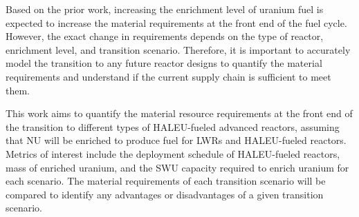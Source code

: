 Based on the prior work, increasing the enrichment level of uranium fuel 
is expected to  
increase the material requirements at the front end of 
the fuel cycle. However, the exact change in requirements depends 
on the type of reactor, enrichment level, and transition scenario.
Therefore, it is important to accurately model the transition to any future
reactor designs to quantify the material requirements and understand
if the current supply chain is sufficient to meet them. 

This work aims to quantify the material resource requirements at the front 
end of the 
transition to different types of \gls{HALEU}-fueled advanced reactors, 
assuming that \gls{NU} will be enriched to produce fuel for \glspl{LWR} and 
\gls{HALEU}-fueled reactors. 
Metrics of interest include the deployment schedule of \gls{HALEU}-fueled 
reactors, mass of enriched uranium, and the \gls{SWU} capacity required to 
enrich uranium for each scenario. The material requirements of each transition 
scenario will be compared to identify any advantages or disadvantages of 
a given transition scenario. 